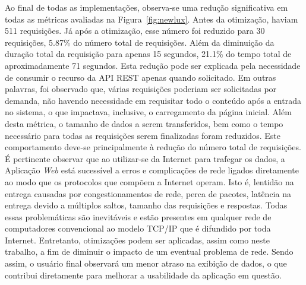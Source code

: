 Ao final de todas as implementações, observa-se uma redução significativa em todas as métricas avaliadas na Figura~\ref{fig:newlux}. Antes da otimização, haviam 511 requisições. Já após a otimização, esse número foi reduzido para 30 requisições, 5.87\% do número total de requisições. Além da diminuição da duração total da requisição para apenas 15 segundos, 21.1\% do tempo total de aproximadamente 71 segundos. Esta redução pode ser explicada pela necessidade de consumir o recurso da API REST apenas quando solicitado. Em outras palavras, foi observado que, várias requisições poderiam ser solicitadas por demanda, não havendo necessidade em requisitar todo o conteúdo após a entrada no sistema, o que impactava, inclusive, o carregamento da página inicial. Além desta métrica, o tamanho de dados a serem transferidos, bem como o tempo necessário para todas as requisições serem finalizadas foram reduzidos. Este comportamento deve-se principalmente à redução do número total de requisições. É pertinente observar que ao utilizar-se da Internet para trafegar os dados, a Aplicação \textit{Web} está sucessível a erros e complicações de rede ligados diretamente ao modo que os protocolos que compõem a Internet operam. Isto é, lentidão na entrega causadas por congestionamentos de rede, perca de pacotes, latência na entrega devido a múltiplos saltos, tamanho das requisições e respostas. Todas essas problemáticas são inevitáveis e estão presentes em qualquer rede de computadores convencional ao modelo TCP/IP que é difundido por toda Internet. Entretanto, otimizações podem ser aplicadas, assim como neste trabalho, a fim de diminuir o impacto de um eventual problema de rede. Sendo assim, o usuário final observará um menor atraso na exibição de dados, o que contribui diretamente para melhorar a usabilidade da aplicação em questão.